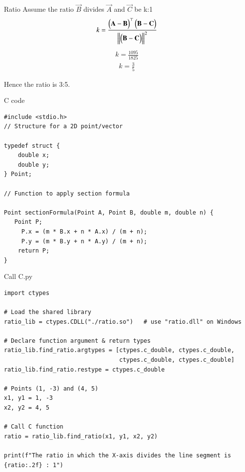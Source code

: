 \documentclass{beamer}
\begin{document}
\begin{frame}{Ratio}
Assume the ratio $\vec{B}$ divides $\vec{A}$  and $\vec{C}$ be k:1
\begin{align}
    k = \frac{\begin{pmatrix}\mathbf{A} - \mathbf{B}\end{pmatrix}^\top \begin{pmatrix}\mathbf{B} - \mathbf{C}\end{pmatrix}}{\left\lVert\begin{pmatrix}\mathbf{B} - \mathbf{C}\end{pmatrix}\right\rVert^2}
\end{align}
\begin{align}
    k = \frac{1095}{1825}
\end{align}
\begin{align}
    k = \frac{3}{5}
\end{align}
\centering
\begin{large}Hence the ratio is 3:5.\end{large}
\end{frame}

\begin{frame}[fragile]{C code}
\begin{lstlisting}
#include <stdio.h>
// Structure for a 2D point/vector

typedef struct {
    double x;
    double y;
} Point;

// Function to apply section formula

Point sectionFormula(Point A, Point B, double m, double n) {
   Point P;
     P.x = (m * B.x + n * A.x) / (m + n);
     P.y = (m * B.y + n * A.y) / (m + n);
    return P;
}
\end{lstlisting}
\end{frame}

\begin{frame}[fragile]{Call C.py}
\begin{lstlisting}
import ctypes

# Load the shared library
ratio_lib = ctypes.CDLL("./ratio.so")   # use "ratio.dll" on Windows

# Declare function argument & return types
ratio_lib.find_ratio.argtypes = [ctypes.c_double, ctypes.c_double,
                                 ctypes.c_double, ctypes.c_double]
ratio_lib.find_ratio.restype = ctypes.c_double

# Points (1, -3) and (4, 5)
x1, y1 = 1, -3
x2, y2 = 4, 5

# Call C function
ratio = ratio_lib.find_ratio(x1, y1, x2, y2)

print(f"The ratio in which the X-axis divides the line segment is {ratio:.2f} : 1")
\end{lstlisting}
\end{frame}
\end{document}
